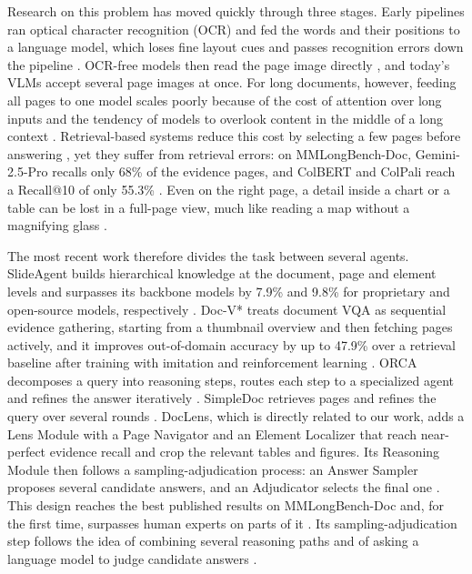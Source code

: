 \documentclass[conference]{IEEEtran}
\begin{document}
Research on this problem has moved quickly through three stages. Early pipelines ran optical character recognition (OCR) and fed the words and their positions to a language model, which loses fine layout cues and passes recognition errors down the pipeline \cite{huang2022layoutlmv3}. OCR-free models then read the page image directly \cite{kim2022donut}, and today's VLMs accept several page images at once. For long documents, however, feeding all pages to one model scales poorly because of the cost of attention over long inputs and the tendency of models to overlook content in the middle of a long context \cite{ma2024mmlongbench,deng2025longdocurl}. Retrieval-based systems reduce this cost by selecting a few pages before answering \cite{santhanam2022colbertv2,faysse2024colpali,yu2024visrag,tanaka2025vdocrag}, yet they suffer from retrieval errors: on MMLongBench-Doc, Gemini-2.5-Pro recalls only 68\% of the evidence pages, and ColBERT and ColPali reach a Recall@10 of only 55.3\% \cite{zhu2025doclens}. Even on the right page, a detail inside a chart or a table can be lost in a full-page view, much like reading a map without a magnifying glass \cite{zhu2025doclens,slideagent}.

The most recent work therefore divides the task between several agents. SlideAgent builds hierarchical knowledge at the document, page and element levels and surpasses its backbone models by 7.9\% and 9.8\% for proprietary and open-source models, respectively \cite{slideagent}. Doc-V* treats document VQA as sequential evidence gathering, starting from a thumbnail overview and then fetching pages actively, and it improves out-of-domain accuracy by up to 47.9\% over a retrieval baseline after training with imitation and reinforcement learning \cite{docvstar}. ORCA decomposes a query into reasoning steps, routes each step to a specialized agent and refines the answer iteratively \cite{orca}. SimpleDoc retrieves pages and refines the query over several rounds \cite{jain2025simpledoc}. DocLens, which is directly related to our work, adds a Lens Module with a Page Navigator and an Element Localizer that reach near-perfect evidence recall and crop the relevant tables and figures. Its Reasoning Module then follows a sampling-adjudication process: an Answer Sampler proposes several candidate answers, and an Adjudicator selects the final one \cite{zhu2025doclens}. This design reaches the best published results on MMLongBench-Doc and, for the first time, surpasses human experts on parts of it \cite{zhu2025doclens}. Its sampling-adjudication step follows the idea of combining several reasoning paths \cite{wang2023selfconsistency,wei2022cot} and of asking a language model to judge candidate answers \cite{zheng2023judging}.
\end{document}
